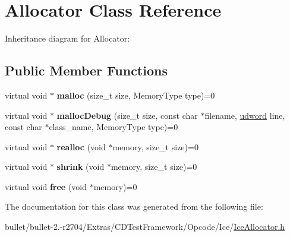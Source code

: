 \hypertarget{class_allocator}{\section{Allocator Class Reference}
\label{class_allocator}
}


Inheritance diagram for Allocator\+:
\subsection*{Public Member Functions}
\begin{DoxyCompactItemize}
\item 
\hypertarget{class_allocator_a43e20fabd7379216c55f9492f0f0b713}{virtual void $\ast$ {\bfseries malloc} (size\+\_\+t size, Memory\+Type type)=0}\label{class_allocator_a43e20fabd7379216c55f9492f0f0b713}

\item 
\hypertarget{class_allocator_a409048fa605c5ed1da4b852f76946498}{virtual void $\ast$ {\bfseries malloc\+Debug} (size\+\_\+t size, const char $\ast$filename, \hyperlink{_ice_types_8h_a44c6f1920ba5551225fb534f9d1a1733}{udword} line, const char $\ast$class\+\_\+name, Memory\+Type type)=0}\label{class_allocator_a409048fa605c5ed1da4b852f76946498}

\item 
\hypertarget{class_allocator_a22d592a1026e68d63816179408ee63c4}{virtual void $\ast$ {\bfseries realloc} (void $\ast$memory, size\+\_\+t size)=0}\label{class_allocator_a22d592a1026e68d63816179408ee63c4}

\item 
\hypertarget{class_allocator_ae6b712959419a7743a0d6461244705a0}{virtual void $\ast$ {\bfseries shrink} (void $\ast$memory, size\+\_\+t size)=0}\label{class_allocator_ae6b712959419a7743a0d6461244705a0}

\item 
\hypertarget{class_allocator_ab9bc1e499c55b0c675c2e4c78f9cd059}{virtual void {\bfseries free} (void $\ast$memory)=0}\label{class_allocator_ab9bc1e499c55b0c675c2e4c78f9cd059}

\end{DoxyCompactItemize}


The documentation for this class was generated from the following file\+:\begin{DoxyCompactItemize}
\item 
bullet/bullet-\/2.-\/r2704/\+Extras/\+C\+D\+Test\+Framework/\+Opcode/\+Ice/\hyperlink{_ice_allocator_8h}{Ice\+Allocator.\+h}\end{DoxyCompactItemize}
